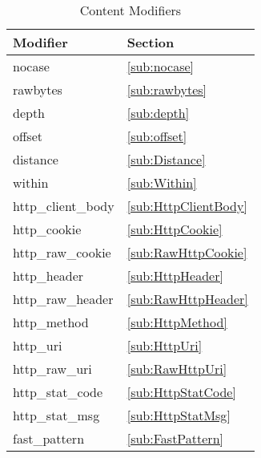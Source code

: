 \documentclass[english]{report}
\begin{document}
\begin{table}[h]
\begin{center}
\caption{Content Modifiers}
\label{Content Modifiers}
\begin{tabular}{|p{1in}|p{1in}|}

\hline 
Modifier & Section \\
\hline

\hline 
nocase & \ref{sub:nocase} \\

\hline
rawbytes & \ref{sub:rawbytes} \\

\hline
depth & \ref{sub:depth} \\

\hline 
offset & \ref{sub:offset} \\

\hline
distance & \ref{sub:Distance} \\

\hline 
within & \ref{sub:Within} \\

\hline
http\_client\_body & \ref{sub:HttpClientBody} \\

\hline 
http\_cookie & \ref{sub:HttpCookie} \\

\hline
http\_raw\_cookie & \ref{sub:RawHttpCookie} \\

\hline 
http\_header & \ref{sub:HttpHeader} \\

\hline 
http\_raw\_header & \ref{sub:RawHttpHeader} \\

\hline 
http\_method & \ref{sub:HttpMethod} \\

\hline 
http\_uri & \ref{sub:HttpUri} \\

\hline 
http\_raw\_uri & \ref{sub:RawHttpUri} \\

\hline
http\_stat\_code & \ref{sub:HttpStatCode} \\

\hline
http\_stat\_msg & \ref{sub:HttpStatMsg} \\

\hline
fast\_pattern & \ref{sub:FastPattern} \\

\hline
\end{tabular}
\end{center}
\end{table}
\end{document}
